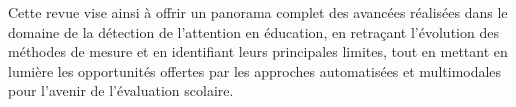 Cette revue vise ainsi à offrir un panorama complet des avancées réalisées dans le domaine de la détection de l’attention en éducation, en retraçant l’évolution des méthodes de mesure et en identifiant leurs principales limites, tout en mettant en lumière les opportunités offertes par les approches automatisées et multimodales pour l’avenir de l’évaluation scolaire.